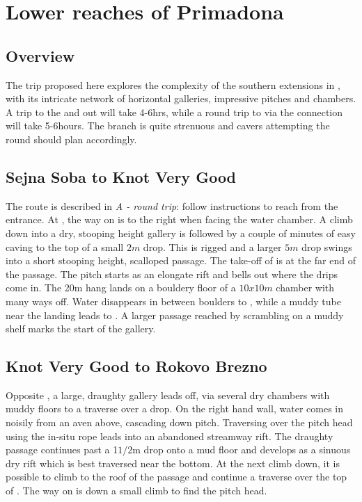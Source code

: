 \section{Lower reaches of Primadona}

\subsection{Overview}
The trip proposed here explores the complexity of the southern extensions in , with its intricate network of horizontal galleries, impressive pitches and chambers. A trip to the  and out will take 4-6hrs, while a round trip to  via the  connection will take 5-6hours. The  branch is quite strenuous and cavers attempting the round should plan accordingly. 

\subsection{Sejna Soba to Knot Very Good}
The route is described in \emph{A - round trip}: follow instructions to reach  from the  entrance. At , the way on is to the right when facing the water chamber. A climb down into a dry, stooping height gallery is followed by a couple of minutes of easy caving to the top of a small $2m$ drop. This is rigged and a larger $5m$ drop swings into a short stooping height, scalloped passage. The take-off of  is at the far end of the passage. The pitch starts as an elongate rift and bells out where the drips come in. The 20m hang lands on a bouldery floor of a $10x10m$ chamber with many ways off. Water disappears in between boulders to , while a muddy tube near the landing leads to . A larger passage reached by scrambling on a muddy shelf marks the start of the  gallery.

\subsection{Knot Very Good to Rokovo Brezno}
 Opposite , a large, draughty gallery leads off, via several dry chambers with muddy floors to a traverse over a drop. On the right hand wall, water comes in noisily from an aven above, cascading down  pitch. Traversing over the pitch head using the in-situ rope leads into an abandoned streamway rift.  The draughty passage continues past a 1$1/2$m drop onto a mud floor and develops as a sinuous dry rift which is best traversed near the bottom. At the next climb down, it is possible to climb to the roof of the passage and continue a traverse over the top of . The way on is down a small climb to find the pitch head.

